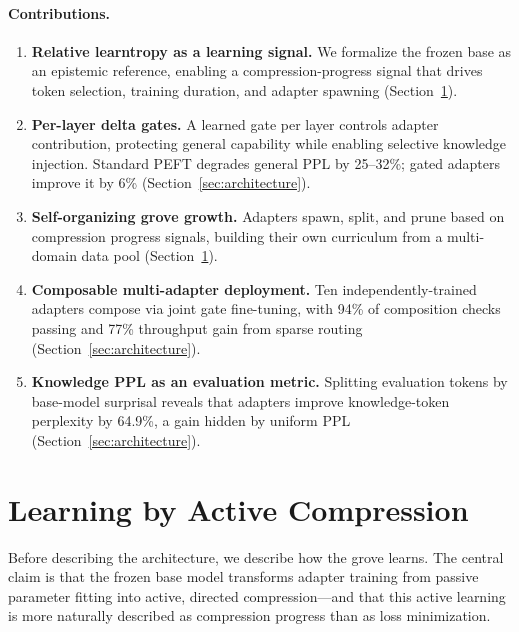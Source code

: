 \documentclass{article}
\begin{document}
\paragraph{Contributions.}
\begin{enumerate}[nosep,leftmargin=1.5em]
\item \textbf{Relative learntropy as a learning signal.} We formalize
      the frozen base as an epistemic reference, enabling a
      compression-progress signal that drives token selection, training
      duration, and adapter spawning (Section~\ref{sec:learning}).
\item \textbf{Per-layer delta gates.} A learned gate per layer controls
      adapter contribution, protecting general capability while enabling
      selective knowledge injection. Standard PEFT degrades general PPL
      by 25--32\%; gated adapters improve it by 6\%
      (Section~\ref{sec:architecture}).
\item \textbf{Self-organizing grove growth.} Adapters spawn, split, and
      prune based on compression progress signals, building their own
      curriculum from a multi-domain data pool
      (Section~\ref{sec:learning}).
\item \textbf{Composable multi-adapter deployment.} Ten
      independently-trained adapters compose via joint gate fine-tuning,
      with 94\% of composition checks passing and 77\% throughput gain
      from sparse routing (Section~\ref{sec:architecture}).
\item \textbf{Knowledge PPL as an evaluation metric.} Splitting
      evaluation tokens by base-model surprisal reveals that adapters
      improve knowledge-token perplexity by 64.9\%, a gain hidden by
      uniform PPL (Section~\ref{sec:architecture}).
\end{enumerate}

\section{Learning by Active Compression}
\label{sec:learning}

Before describing the architecture, we describe how the grove learns.
The central claim is that the frozen base model transforms adapter
training from passive parameter fitting into active, directed
compression---and that this active learning is more naturally described
as compression progress than as loss minimization.

\end{document}

